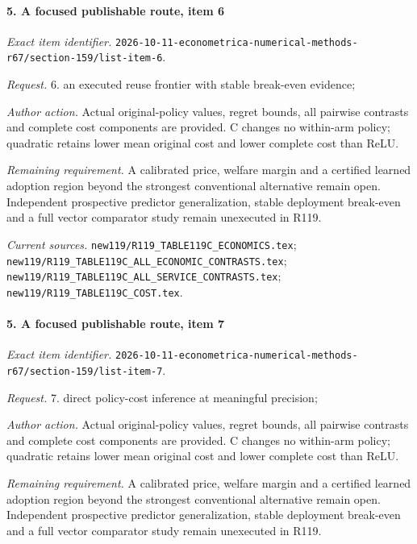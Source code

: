 \paragraph{5. A focused publishable route, item 6}

\emph{Exact item identifier.} \nolinkurl{2026-10-11-econometrica-numerical-methods-r67/section-159/list-item-6}.

\par\emph{Request.} 6. an executed reuse frontier with stable break-even evidence;

\par\emph{Author action.} Actual original-policy values, regret bounds, all pairwise contrasts and complete cost components are provided. C changes no within-arm policy; quadratic retains lower mean original cost and lower complete cost than ReLU.

\par\emph{Remaining requirement.} A calibrated price, welfare margin and a certified learned adoption region beyond the strongest conventional alternative remain open. Independent prospective predictor generalization, stable deployment break-even and a full vector comparator study remain unexecuted in R119.

\par\emph{Current sources.} \nolinkurl{new119/R119_TABLE119C_ECONOMICS.tex}; \nolinkurl{new119/R119_TABLE119C_ALL_ECONOMIC_CONTRASTS.tex}; \nolinkurl{new119/R119_TABLE119C_ALL_SERVICE_CONTRASTS.tex}; \nolinkurl{new119/R119_TABLE119C_COST.tex}.

\paragraph{5. A focused publishable route, item 7}

\emph{Exact item identifier.} \nolinkurl{2026-10-11-econometrica-numerical-methods-r67/section-159/list-item-7}.

\par\emph{Request.} 7. direct policy-cost inference at meaningful precision;

\par\emph{Author action.} Actual original-policy values, regret bounds, all pairwise contrasts and complete cost components are provided. C changes no within-arm policy; quadratic retains lower mean original cost and lower complete cost than ReLU.

\par\emph{Remaining requirement.} A calibrated price, welfare margin and a certified learned adoption region beyond the strongest conventional alternative remain open. Independent prospective predictor generalization, stable deployment break-even and a full vector comparator study remain unexecuted in R119.

